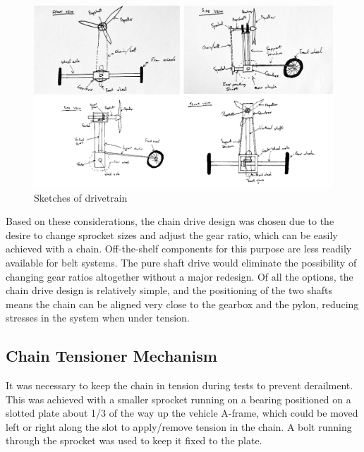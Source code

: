 \begin{figure}[!htbp]
    \centering
    \includegraphics{images/part9/drivetrainSketches.png}
    \caption{Sketches of drivetrain}
    \label{fig:dtsketches}
\end{figure}



Based on these considerations, the chain drive design was chosen due to the desire to change sprocket sizes and adjust the gear ratio, which can be easily achieved with a chain. Off-the-shelf components for this purpose are less readily available for belt systems. The pure shaft drive would eliminate the possibility of changing gear ratios altogether without a major redesign.
Of all the options, the chain drive design is relatively simple, and the positioning of the two shafts means the chain can be aligned very close to the gearbox and the pylon, reducing stresses in the system when under tension.

\subsection{Chain Tensioner Mechanism}

It was necessary to keep the chain in tension during tests to prevent derailment. This was achieved with a smaller sprocket running on a bearing positioned on a slotted plate about 1/3 of the way up the vehicle A-frame, which could be moved left or right along the slot to apply/remove tension in the chain. A bolt running through the sprocket was used to keep it fixed to the plate.

